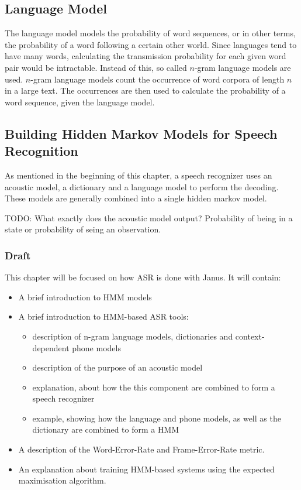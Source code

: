 \subsection{Language Model}
\label{sec:language_model}
The language model models the probability of word sequences, or in other terms, the probability of a word following a certain other world. Since languages tend to have many words, calculating the transmission probability for each given word pair would be intractable. Instead of this, so called $n$-gram language models are used. $n$-gram language models count the occurrence of word corpora of length $n$ in a large text. The occurrences are then used to calculate the probability of a word sequence, given the language model. 

 

\subsection{Building Hidden Markov Models for Speech Recognition}

As mentioned in the beginning of this chapter, a speech recognizer uses an acoustic model, a dictionary and a language model to perform the decoding. These models are generally combined into a single hidden markov model. 
 
TODO: What exactly does the acoustic model output? Probability of being in a state or probability of seing an observation. 
\subsubsection{Draft}

This chapter will be focused on how ASR is done with Janus. It will contain: 
\begin{itemize}
	\item A brief introduction to HMM models
	\item A brief introduction to HMM-based ASR tools:
	\begin{itemize}
		\item description of n-gram language models, dictionaries and context-dependent phone models
		\item description of the purpose of an acoustic model
		\item explanation, about how the this component are combined to form a speech recognizer 
		\item example, showing how the language and phone models, as well as the dictionary are combined to form a HMM
	\end{itemize}
	\item A description of the Word-Error-Rate and Frame-Error-Rate metric. 
	\item An explanation about training HMM-based systems using the expected maximisation algorithm. 
\end{itemize}

